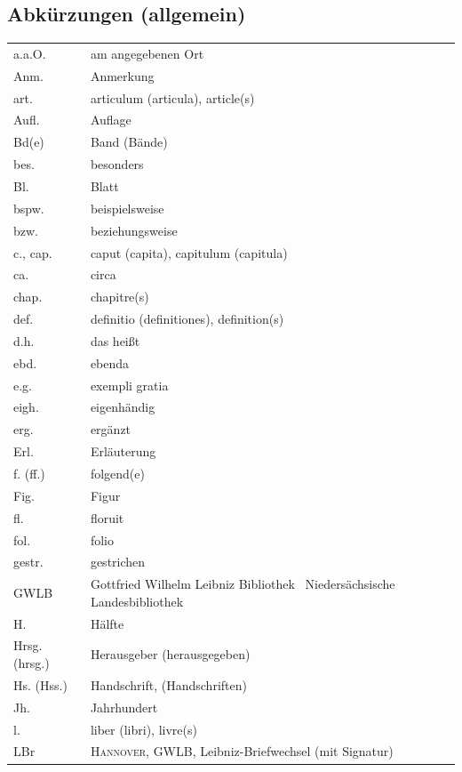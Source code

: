 \vspace{1ex}


\subsection{Abkürzungen \lowercase{(allgemein)}}
\vspace{-2.5ex}


\begin{longtable}{ll}
a.a.O. 	& am angegebenen Ort\\
Anm. 	& Anmerkung\\
art. 		& articulum (articula), article(s)\\
Aufl. 		& Auflage\\
Bd(e) 	& Band (Bände)\\	%
bes. 		& besonders\\
Bl. 		& Blatt\\
bspw. 	& beispielsweise\\
bzw.  	& beziehungsweise\\
c., cap.	& caput (capita), capitulum (capitula)\\
ca. 		& circa\\
chap. 	& chapitre(s)\\
def. 		& definitio (definitiones), definition(s)\\
d.h. 		& das heißt\\
ebd. 		& ebenda\\
e.g. 		& exempli gratia\\
eigh.		& eigenhändig\\
erg. 		& ergänzt\\
Erl. 		& Erläuterung\\
f. (ff.) 	& folgend(e)\\
Fig. 		& Figur\\
fl. 		& floruit\\
fol. 		& folio\\
gestr. 	& gestrichen\\
GWLB 	& Gottfried Wilhelm Leibniz Bibliothek \textendash\ Niedersächsische Landesbibliothek\\
H. 		& Hälfte\\
Hrsg. (hrsg.) 	& Herausgeber (herausgegeben)\\
Hs. (Hss.) 	& Handschrift, (Handschriften)\\
Jh. 		& Jahrhundert\\
l. 		& liber (libri), livre(s)\\
LBr 		& \textsc{Hannover}, GWLB, Leibniz-Briefwechsel (mit Signatur)\\

\end{longtable}

